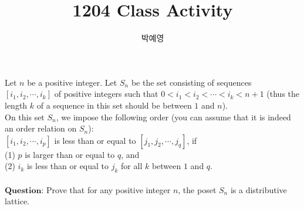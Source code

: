\documentclass[a4paper, 12pt]{article}
\title{1204 Class Activity}
\author{박예영}
\date{}
\begin{document}
\maketitle
\begin{mdframed}
Let $n$ be a positive integer. Let $S_n$ be the set consisting of sequences $[i_1, i_2, \cdots, i_k]$ of positive integers such that $0 < i_1  <  i_2 <  \cdots  < i_k < n+1$ (thus the length $k$ of a sequence in this set should be between $1$ and $n$).\\
On this set $S_n$, we impose the following order (you can assume that it is indeed an order relation on $S_n$):\\
$[i_1, i_2, \cdots, i_p]$ is less than or equal to $[j_1, j_2, \cdots, j_q]$, if\\
(1) $p$ is larger than or equal to $q$, and \\
(2) $i_k$ is less than or equal to $j_k$ for all $k$ between $1$ and $q$.\\\\
$\textbf{Question}$: Prove that for any positive integer $n$, the poset $S_n$ is a distributive lattice.
\end{mdframed}
\end{document}

